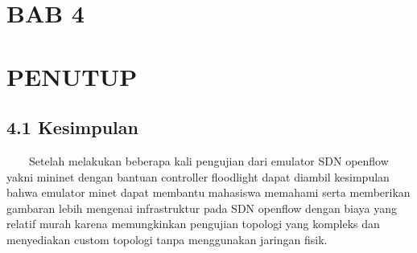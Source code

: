 \begin{center}
\section{BAB 4}
\section{PENUTUP}
\end{center}
\subsection{4.1 Kesimpulan}
\ \ \ \ Setelah melakukan beberapa kali pengujian dari emulator SDN openflow yakni mininet dengan bantuan controller floodlight
dapat diambil kesimpulan bahwa emulator minet dapat membantu mahasiswa memahami serta memberikan gambaran lebih
mengenai infrastruktur pada SDN openflow dengan biaya yang relatif murah karena memungkinkan pengujian topologi yang
kompleks dan menyediakan custom topologi tanpa menggunakan jaringan fisik.
